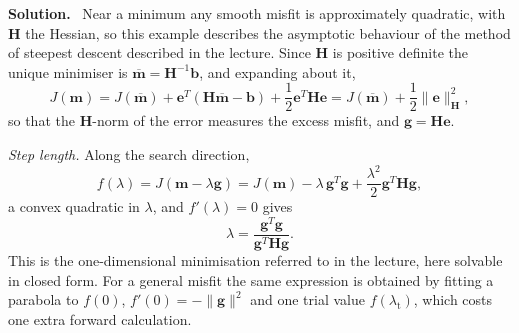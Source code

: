\documentclass[a4paper,12pt]{paper}
\newcounter{example}
\newenvironment{solution}{\par\noindent\textbf{Solution.}\ }{\par\medskip}
\begin{document}
\begin{solution}
Near a minimum any smooth misfit is approximately quadratic, with $\mathbf{H}$ the Hessian, so this example describes the
asymptotic behaviour of the method of steepest descent described in the lecture. Since $\mathbf{H}$ is positive definite the
unique minimiser is $\overline{\mathbf{m}}=\mathbf{H}^{-1}\mathbf{b}$, and expanding about it,
\begin{equation}
J(\mathbf{m})=J(\overline{\mathbf{m}})+\mathbf{e}^{T}(\mathbf{H}\overline{\mathbf{m}}-\mathbf{b})+\frac{1}{2}\mathbf{e}^{T}\mathbf{H}\mathbf{e}
=J(\overline{\mathbf{m}})+\frac{1}{2}\|\mathbf{e}\|_{\mathbf{H}}^{2},
\label{eq:19}
\end{equation}
so that the $\mathbf{H}$-norm of the error measures the excess misfit, and $\mathbf{g}=\mathbf{H}\mathbf{e}$.

\emph{Step length.} Along the search direction,
\begin{equation}
f(\lambda)=J(\mathbf{m}-\lambda\mathbf{g})=J(\mathbf{m})-\lambda\,\mathbf{g}^{T}\mathbf{g}+\frac{\lambda^{2}}{2}\mathbf{g}^{T}\mathbf{H}\mathbf{g},
\label{eq:20}
\end{equation}
a convex quadratic in $\lambda$, and $f'(\lambda)=0$ gives
\begin{equation}
\lambda=\frac{\mathbf{g}^{T}\mathbf{g}}{\mathbf{g}^{T}\mathbf{H}\mathbf{g}}.
\label{eq:21}
\end{equation}
This is the one-dimensional minimisation referred to in the lecture, here solvable in closed form. For a general misfit the
same expression is obtained by fitting a parabola to $f(0)$, $f'(0)=-\|\mathbf{g}\|^{2}$ and one trial value $f(\lambda_{\mathrm{t}})$,
which costs one extra forward calculation.


\end{solution}
\end{document}
